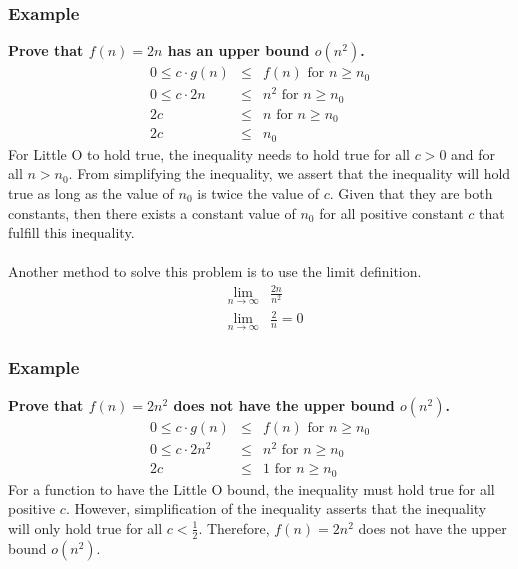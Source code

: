 \subsubsection{Example}
\textbf{Prove that $f(n) = 2n$ has an upper bound $o(n^2)$.}
\begin{eqnarray*}
	0 \leq c \cdot g(n) &\leq& f(n) \text{ for } n \geq n_0\\
	0 \leq c \cdot 2n &\leq& n^2 \text{ for } n \geq n_0\\
	2c &\leq& n \text{ for } n \geq n_0\\
	2c &\leq& n_0
\end{eqnarray*}
For Little O to hold true, the inequality needs to hold true for all $c > 0$ and for all $n > n_0$. From simplifying the inequality, we assert that the inequality will hold true as long as the value of $n_0$ is twice the value of $c$. Given that they are both constants, then there exists a constant value of $n_0$ for all positive constant $c$ that fulfill this inequality.\\\\
Another method to solve this problem is to use the limit definition.
\begin{eqnarray*}
	&\lim\limits_{n\to\infty}& \frac{2n}{n^2}\\
	&\lim\limits_{n\to\infty}& \frac{2}{n} = 0	
\end{eqnarray*}

\subsubsection{Example}
\textbf{Prove that $f(n) = 2n^2$ does not have the upper bound $o(n^2)$.}
\begin{eqnarray*}
	0 \leq c \cdot g(n) &\leq& f(n) \text{ for } n \geq n_0\\
	0 \leq c \cdot 2n^2 &\leq& n^2 \text{ for } n \geq n_0\\
	2c &\leq& 1\text{ for } n \geq n_0
\end{eqnarray*}
For a function to have the Little O bound, the inequality must hold true for all positive $c$. However, simplification of the inequality asserts that the inequality will only hold true for all $c < \frac{1}{2}$. Therefore, $f(n) = 2n^2$ does not have the upper bound $o(n^2)$.